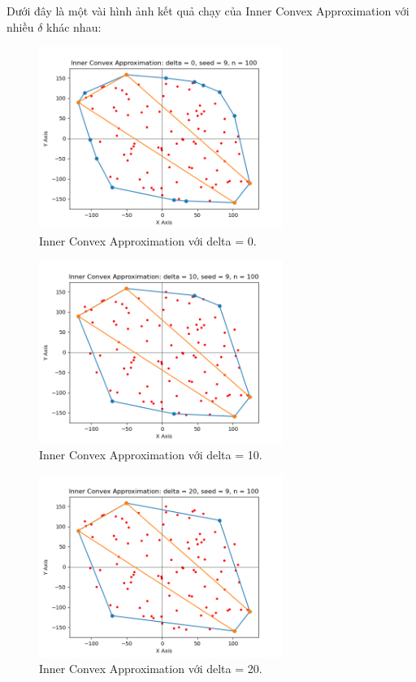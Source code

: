 \documentclass[12pt,a4paper,openany,oneside]{report}
\begin{document}
 Dưới đây là một vài hình ảnh kết quả chạy của Inner Convex Approximation với nhiều $\delta$ khác nhau:
\begin{figure}[ht!]
	\begin{center}
		\includegraphics[width=300px]{./inner_cv_delta0.png}
		\caption{Inner Convex Approximation với delta = 0.}
		\label{inner_cv_delta0}
	\end{center}
\end{figure} 
\begin{figure}[ht!]
	\begin{center}
		\includegraphics[width=300px]{./inner_cv_delta10.png}
		\caption{Inner Convex Approximation với delta = 10.}
		\label{inner_cv_delta10}
	\end{center}
\end{figure} 
\begin{figure}[ht!]
	\begin{center}
		\includegraphics[width=300px]{./inner_cv_delta20.png}
		\caption{Inner Convex Approximation với delta = 20.}
		\label{inner_cv_delta20}
	\end{center}
\end{figure} 
\end{document}
